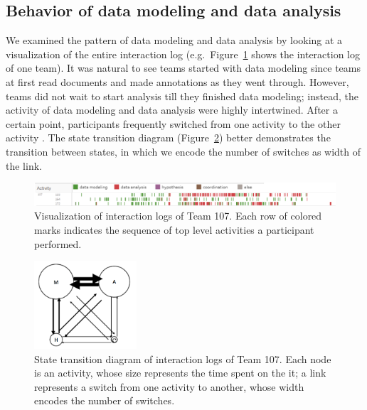 \subsection{Behavior of data modeling and data
analysis}\label{behavior-of-data-modeling-and-data-analysis}

We examined the pattern of data modeling and data analysis by looking at
a visualization of the entire interaction log (e.g.~Figure~\ref{fig:sequence} shows the interaction log of one team). It was natural to see teams
started with data modeling since teams at first read documents and made annotations as they went through. However, teams did not wait to start analysis till they
finished data modeling; instead, the activity of data modeling and data
analysis were highly intertwined. After a certain point, participants frequently
switched from one activity to the other activity . The state
transition diagram (Figure~\ref{fig:transition}) better demonstrates the
transition between states, in which we encode the number of switches as
width of the link.

\begin{figure}
\centering
\includegraphics[width=6.5in]{./img/G107-sequence.png}
\caption{Visualization of interaction logs of Team 107. Each row of
colored marks indicates the sequence of top level activities a
participant performed.}\label{fig:sequence}
\end{figure}

\begin{figure}
\centering
\includegraphics[width=1.5in]{./img/activity_transition-G107.png}
\caption{State transition diagram of interaction logs of Team 107. Each
node is an activity, whose size represents the time spent on the it; a
link represents a switch from one activity to another, whose width
encodes the number of switches.}\label{fig:transition}
\end{figure}

